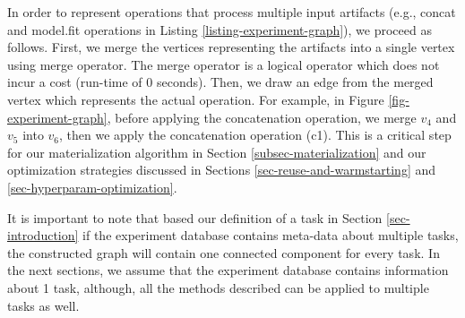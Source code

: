 In order to represent operations that process multiple input artifacts (e.g., concat and model.fit operations in Listing \ref{listing-experiment-graph}), we proceed as follows.
First, we merge the vertices representing the artifacts into a single vertex using merge operator.
The merge operator is a logical operator which does not incur a cost (run-time of 0 seconds).
Then, we draw an edge from the merged vertex which represents the actual operation.
For example, in Figure \ref{fig-experiment-graph}, before applying the concatenation operation, we merge $v_4$ and $v_5$ into $v_6$, then we apply the concatenation operation (c1).
This is a critical step for our materialization algorithm in Section \ref{subsec-materialization} and our optimization strategies discussed in Sections \ref{sec-reuse-and-warmstarting} and \ref{sec-hyperparam-optimization}.

It is important to note that based our definition of a task in Section \ref{sec-introduction} if the experiment database contains meta-data about multiple tasks, the constructed graph will contain one connected component for every task.
In the next sections, we assume that the experiment database contains information about 1 task, although, all the methods described can be applied to multiple tasks as well.

